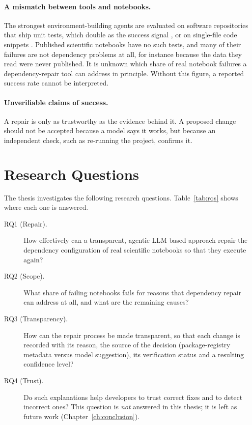 \paragraph{A mismatch between tools and notebooks.}
The strongest environment-building agents are evaluated on software repositories that ship unit tests, which double as the success signal \cite{hu2025repo2run}, or on single-file code snippets \cite{bartlett2025lastdependency}. Published scientific notebooks have no such tests, and many of their failures are not dependency problems at all, for instance because the data they read were never published. It is unknown which share of real notebook failures a dependency-repair tool can address in principle. Without this figure, a reported success rate cannot be interpreted.

\paragraph{Unverifiable claims of success.}
A repair is only as trustworthy as the evidence behind it. A proposed change should not be accepted because a model says it works, but because an independent check, such as re-running the project, confirms it.

\section{Research Questions}\label{sec:rqs}

The thesis investigates the following research questions. Table~\ref{tab:rqs} shows where each one is answered.

\begin{description}
  \item[RQ1 (Repair).] How effectively can a transparent, agentic \ac{LLM}-based approach repair the dependency configuration of real scientific notebooks so that they execute again?
  \item[RQ2 (Scope).] What share of failing notebooks fails for reasons that dependency repair can address at all, and what are the remaining causes?
  \item[RQ3 (Transparency).] How can the repair process be made transparent, so that each change is recorded with its reason, the source of the decision (package-registry metadata versus model suggestion), its verification status and a resulting confidence level?
  \item[RQ4 (Trust).] Do such explanations help developers to trust correct fixes and to detect incorrect ones? This question is \emph{not} answered in this thesis; it is left as future work (Chapter~\ref{ch:conclusion}).
\end{description}


